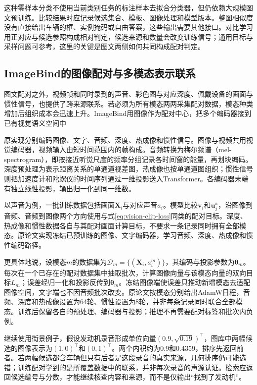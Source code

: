 这种零样本分类不使用当前类别任务的标注样本去拟合分类器，但仍依赖大规模图文预训练。比较结果时应记录候选集合、模板、图像处理和模型版本。整图相似度没有直接给出车辆的框、实例掩码或自由答案，这些输出需要其他接口。对比学习用正对应与候选参照构成相对判定，候选来源和数量会改变训练信号；通用目标与采样问题可参考，这里的关键是图文两侧如何共同构成配对判定。

\subsection{ImageBind的图像配对与多模态表示联系}
\label{sec:vision-models-imagebind}

图文配对之外，视频帧和同时录到的声音、彩色图与对应深度、佩戴设备的画面与惯性信号，也提供了跨来源联系。若必须为所有模态两两采集配对数据，模态种类增加后组织成本会迅速上升。ImageBind用图像作为配对中心，把多个编码器接到已有视觉语义空间中

原实现分别编码图像、文字、音频、深度、热成像和惯性信号。图像与视频共用视觉编码器，视频输入由短时间范围内的帧构成。音频转换为梅尔频谱（mel-spectrogram），即按接近听觉尺度的频率分组记录各时间窗的能量，再划块编码。深度预处理为表示距离关系的单通道视差图，热成像也按单通道图组织；惯性信号则把加速度计和陀螺仪的时间序列通过一维投影送入Transformer。各编码器末端有独立线性投影，输出归一化到同一维数。

以声音为例，一批训练数据包括画面$\bm{X}_i$与对应声音$a_i$。模型比较$\bm{v}_i$和$\bm{u}^{\mathrm a}_j$，沿图像到音频、音频到图像两个方向使用与式\eqref{eq:vision-clip-loss}同类的配对目标。深度、热成像和惯性数据各自与其配对画面计算目标，不要求一条记录同时拥有全部模态。原论文实现冻结已预训练的图像、文字编码器，学习音频、深度、热成像和惯性编码路径。

更具体地说，设模态$m$的数据集为$\mathcal D_m=\{(\bm X_i,a_i^{m})\}$，其编码与投影参数为$\bm\theta_m$。每次在一个已存在的配对数据集中抽取批次，计算图像向量与该模态向量的双向目标$L_m$；误差经归一化和投影反传到$\bm\theta_m$。冻结图像端使误差只推动新增模态去适配图像空间，文字端也不因音频批次改变。原论文按模态分别给出AdamW日程，音频、深度和热成像设置为64轮、惯性设置为8轮，并非每条记录同时联合全部模态。训练后保留各自的预处理、编码器与投影；推理不再需要配对标签和批次内负例。

继续使用街景例子，假设发动机录音形成单位向量$(0.9,\sqrt{0.19})^\top$，图库中两幅候选的图像表示为$(1,0)^\top$和$(0,1)^\top$。两个内积约为0.9和0.4359，排序先返回前者。若两幅候选都含车辆但只有后者是这段录音的真实来源，几何排序仍可能选错；训练配对学到的是所覆盖数据中的联系，并非每次录音的声源认证。检索应返回候选编号与分数，才能继续核查内容和来源，而不是仅输出“找到了发动机”。

